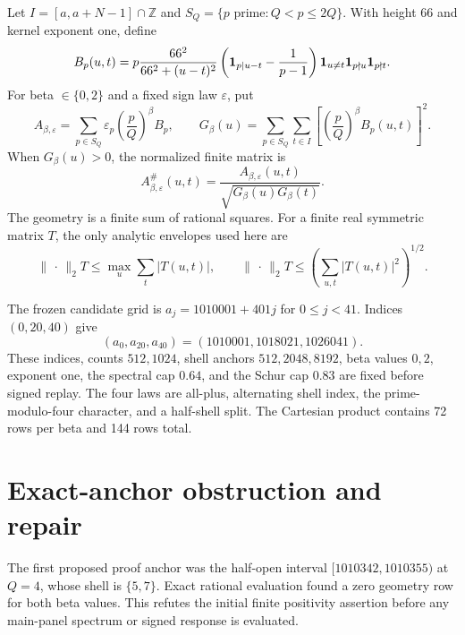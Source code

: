 \documentclass[10pt]{article}
\newcommand{\opnorm}{\lVert\,\cdot\,\rVert_2}
\begin{document}
Let $I=[a,a+N-1]\cap\mathbb Z$ and
$S_Q=\{p\text{ prime}:Q<p\leq2Q\}$.  With height 66 and kernel exponent one,
define
\begin{equation}
B_p(u,t)=p\frac{66^2}{66^2+(u-t)^2}
 \left({\bf1}_{p\mid u-t}-\frac1{p-1}\right)
 \mathbf 1_{u\ne t}\mathbf 1_{p\nmid u}\mathbf 1_{p\nmid t}.
\label{eq:block}
\end{equation}
For beta $\in\{0,2\}$ and a fixed sign law $\varepsilon$, put
\begin{equation}
A_{\beta,\varepsilon}=\sum_{p\in S_Q}\varepsilon_p
 \left(\frac pQ\right)^\beta B_p,
\qquad
G_\beta(u)=\sum_{p\in S_Q}\sum_{t\in I}
 \left[\left(\frac pQ\right)^\beta B_p(u,t)\right]^2.
\label{eq:weighted}
\end{equation}
When $G_\beta(u)>0$, the normalized finite matrix is
\begin{equation}
A_{\beta,\varepsilon}^{\#}(u,t)=
\frac{A_{\beta,\varepsilon}(u,t)}
 {\sqrt{G_\beta(u)G_\beta(t)}}.
\label{eq:norm}
\end{equation}
The geometry is a finite sum of rational squares.  For a finite real
symmetric matrix $T$, the only analytic envelopes used here are
\begin{equation}
\opnorm{T}\leq\max_u\sum_t|T(u,t)|,
\qquad
\opnorm{T}\leq\left(\sum_{u,t}|T(u,t)|^2\right)^{1/2}.
\label{eq:envelopes}
\end{equation}

The frozen candidate grid is $a_j=1010001+401j$ for $0\leq j<41$.
Indices $(0,20,40)$ give
\begin{equation*}
(a_0,a_{20},a_{40})=(1010001,1018021,1026041).
\end{equation*}
These indices, counts $512,1024$, shell anchors $512,2048,8192$, beta
values $0,2$, exponent one, the spectral cap $0.64$, and the Schur cap
$0.83$ are fixed before signed replay.  The four laws are all-plus,
alternating shell index, the prime-modulo-four character, and a half-shell
split.  The Cartesian product contains 72 rows per beta and 144 rows total.

\section{Exact-anchor obstruction and repair}

The first proposed proof anchor was the half-open interval
$[1010342,1010355)$ at $Q=4$, whose shell is $\{5,7\}$.  Exact rational
evaluation found a zero geometry row for both beta values.  This refutes the
initial finite positivity assertion before any main-panel spectrum or signed
response is evaluated.
\end{document}
